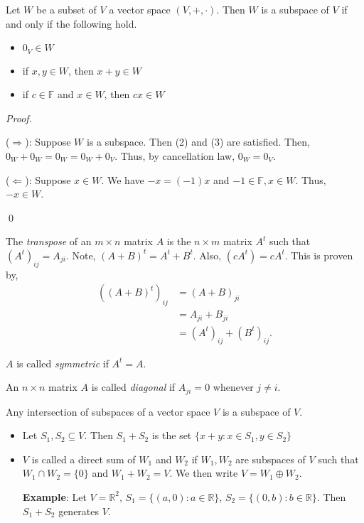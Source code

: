 \documentclass[12pt]{article}
\newenvironment{theorem}[2][Theorem]{\begin{trivlist}
\item[\hskip \labelsep {\bfseries #1}\hskip \labelsep {\bfseries #2.}]}{\end{trivlist}}
\newenvironment{definition}[2][Definition]{\begin{trivlist}
\item[\hskip \labelsep {\bfseries #1}\hskip \labelsep {\bfseries #2}]}{\end{trivlist}}
\newenvironment{sol}
    {\emph{Proof.}
    }
    {
    \qed
    }
\begin{document}
\begin{theorem}{1.3}
Let $W$ be a subset of $V$ a vector space $(V, +, \cdot)$. Then $W$ is a subspace of $V$ if and only if the following hold.
\begin{itemize}
    \item[(1)] $0_V \in W$
    \item[(2)] if $x,y \in W$, then $x + y \in W$
    \item[(3)] if $c \in \mathbb{F}$ and $x \in W$, then $cx \in W$
\end{itemize}
\end{theorem}

\begin{sol}
($\Longrightarrow$): Suppose $W$ is a subspace. Then (2) and (3) are satisfied. Then, $0_W + 0_W = 0_W = 0_W + 0_V$. Thus, by cancellation law, $0_W = 0_V$.

($\Longleftarrow$): Suppose $x \in W$. We have $-x = (-1)x$ and $-1 \in \mathbb{F}, x \in W$. Thus, $-x \in W$.
\end{sol}

\vspace{1em}

\noindent The \textit{transpose} of an $m \times n$ matrix $A$ is the $n \times m$ matrix $A^t$ such that $(A^t)_{ij} = A_{ji}$. Note, $(A + B)^t = A^t + B^t$. Also, $(cA^t) = cA^t$. This is proven by,
\begin{align*}
    ((A+B)^t)_{ij} &= (A + B)_{ji} \\
    &= A_{ji} + B_{ji} \\
    &= (A^t)_{ij} + (B^t)_{ij}.
\end{align*}

\vspace{1em}

\noindent $A$ is called \textit{symmetric} if $A^t = A$.

\vspace{1em}

\noindent An $n \times n$ matrix $A$ is called \textit{diagonal} if $A_{ji} = 0$ whenever $j \neq i$.

\begin{theorem}{1.4}
Any intersection of subspaces of a vector space $V$ is a subspace of $V$.
\end{theorem}

\begin{definition}{3} \text{ }
\begin{itemize}
    \item Let $S_1, S_2 \subseteq V$. Then $S_1 + S_2$ is the set $\{x + y : x \in S_1, y \in S_2\}$
    \item $V$ is called a direct sum of $W_1$ and $W_2$ if $W_1,W_2$ are subspaces of $V$ such that $W_1 \cap W_2 = \{0\}$ and $W_1 + W_2 = V$. We then write $V = W_1 \oplus W_2$.
    
    \textbf{Example}: Let $V = \mathbb{R}^2$, $S_1 = \{(a,0) : a \in \mathbb{R}\}$, $S_2 = \{(0,b) : b \in \mathbb{R}\}$. Then $S_1 + S_2$ generates $V$.
\end{itemize}
\end{definition}
\end{document}
